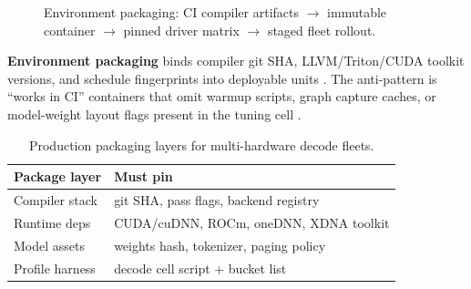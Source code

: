 
\begin{figure}[t]
\centering
{}
\caption{Environment packaging: CI compiler artifacts $\rightarrow$ immutable container $\rightarrow$ pinned driver matrix $\rightarrow$ staged fleet rollout.}
\label{fig:env_packaging_pipeline}
\end{figure}

\textbf{Environment packaging} binds compiler git SHA, LLVM/Triton/CUDA toolkit versions, and schedule fingerprints into deployable units \citep{chen2020compilerbasedhardw,yirage2026,patel2025llminference,memoryfloor2026,taxbreak2026,kwon2023vllm,liu2024deepseekv3,amd2024aie,dlbook,semianalysis2024tma,amd2024xdna,dao2022flashattention,dao2023flashdecoding,nvidia2024cudagraphs,nvidia2022hopper}. The anti-pattern is ``works in CI'' containers that omit warmup scripts, graph capture caches, or model-weight layout flags present in the tuning cell \citep{memoryfloor2026,nvidia2024cudagraphs,kwon2023vllm,yirage2026,chen2020compilerbasedhardw,patel2025llminference,taxbreak2026,liu2024deepseekv3,amd2024aie,dlbook,semianalysis2024tma,amd2024xdna,dao2022flashattention,dao2023flashdecoding,nvidia2024cudagraphs,nvidia2022hopper}.

\begin{table}[t]
\centering
\small
\begin{tabular}{@{}ll@{}}
\toprule
\textbf{Package layer} & \textbf{Must pin} \\
\midrule
Compiler stack & git SHA, pass flags, backend registry \\
Runtime deps & CUDA/cuDNN, ROCm, oneDNN, XDNA toolkit \\
Model assets & weights hash, tokenizer, paging policy \\
Profile harness & decode cell script + bucket list \\
\bottomrule
\end{tabular}
\caption{Production packaging layers for multi-hardware decode fleets.}
\label{tab:ch26_packaging_layers}
\end{table}


